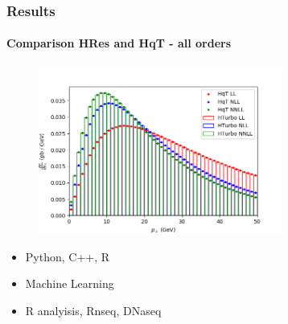 \documentclass[aspectratio=43]{beamer}
\begin{document}
\begin{frame}


\end{frame}

\begin{frame}
	
	\frametitle{Results}
	\framesubtitle{Comparison HRes and HqT - all orders}
	
	\begin{figure}
		\includegraphics[width = 8cm]{plots/hturbo_all_orders.png}
	\end{figure}
	
	\begin{itemize}
		\item Python, C++, R	
		\item Machine Learning
		\item R analyisis, Rnseq, DNaseq
	\end{itemize}

\end{frame}
\end{document}
